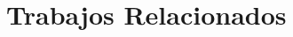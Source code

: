 \documentclass[sigconf]{acmart}
\begin{document}






\section{Trabajos Relacionados}

\end{document}
